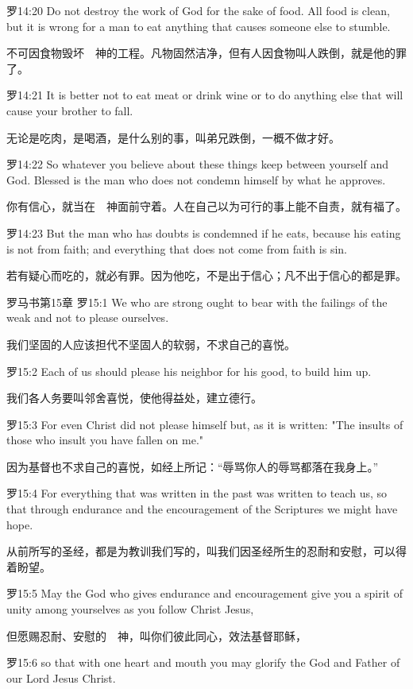 \documentclass[a4paper,11pt,onecolumn,twoside]{ctexart}
\begin{document}
\begin{multicols}{2}
 罗14:20
 Do not destroy the work of God for the sake of food. All food is clean, but it is wrong for a man to eat anything that causes someone else to stumble.

 不可因食物毁坏　神的工程。凡物固然洁净，但有人因食物叫人跌倒，就是他的罪了。


 罗14:21
 It is better not to eat meat or drink wine or to do anything else that will cause your brother to fall.

 无论是吃肉，是喝酒，是什么别的事，叫弟兄跌倒，一概不做才好。


 罗14:22
 So whatever you believe about these things keep between yourself and God. Blessed is the man who does not condemn himself by what he approves.

 你有信心，就当在　神面前守着。人在自己以为可行的事上能不自责，就有福了。


 罗14:23
 But the man who has doubts is condemned if he eats, because his eating is not from faith; and everything that does not come from faith is sin.

 若有疑心而吃的，就必有罪。因为他吃，不是出于信心；凡不出于信心的都是罪。


 罗马书第15章
 罗15:1
 We who are strong ought to bear with the failings of the weak and not to please ourselves.

 我们坚固的人应该担代不坚固人的软弱，不求自己的喜悦。


 罗15:2
 Each of us should please his neighbor for his good, to build him up.

 我们各人务要叫邻舍喜悦，使他得益处，建立德行。


 罗15:3
 For even Christ did not please himself but, as it is written: "The insults of those who insult you have fallen on me."

 因为基督也不求自己的喜悦，如经上所记：“辱骂你人的辱骂都落在我身上。”


 罗15:4
 For everything that was written in the past was written to teach us, so that through endurance and the encouragement of the Scriptures we might have hope.

 从前所写的圣经，都是为教训我们写的，叫我们因圣经所生的忍耐和安慰，可以得着盼望。


 罗15:5
 May the God who gives endurance and encouragement give you a spirit of unity among yourselves as you follow Christ Jesus,

 但愿赐忍耐、安慰的　神，叫你们彼此同心，效法基督耶稣，


 罗15:6
 so that with one heart and mouth you may glorify the God and Father of our Lord Jesus Christ.


\end{multicols}
\end{document}

